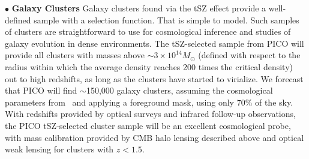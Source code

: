 \documentclass[PICOReport.tex]{subfiles}
\begin{document}
%
\noindent$\bullet$ {\bf Galaxy Clusters} \hspace{0.1in} \label{clusters}  Galaxy clusters found via the tSZ  effect provide a well-defined sample with a selection function. That is simple to model. Such samples of clusters are straightforward to use for cosmological inference and studies of galaxy evolution in dense environments. The tSZ-selected sample from PICO will provide all clusters with masses above $\sim3\times10^{14} M_\odot$ (defined with respect to the radius within which the average density reaches 200 times the critical density) out to high redshifts, 
as long as the clusters have started to virialize. We forecast that PICO will find $\sim$150,000 galaxy clusters, assuming the cosmological parameters from \planck\ and applying a foreground mask, using only 70\% of the sky. With redshifts provided by optical surveys and infrared follow-up observations, the PICO tSZ-selected cluster sample will be an excellent cosmological probe, with mass calibration provided by CMB halo lensing described above and optical weak lensing for clusters with $z < 1.5$. 
\end{document}
